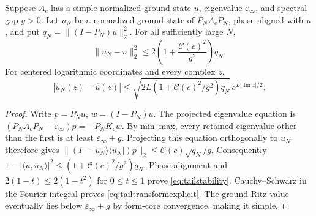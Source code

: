 \begin{proposition}
\label{prop:tailstability}
Suppose $A_c$ has a simple normalized ground state $u$, eigenvalue
$\varepsilon_\infty$, and spectral gap $g>0$. Let $u_N$ be a normalized
ground state of $P_NA_cP_N$, phase aligned with $u$, and put
$q_N=\|(I-P_N)u\|_2^2$. For all sufficiently large $N$,
\begin{equation}
 \|u_N-u\|_2^2\le2\left(1+\frac{\mathcal C(c)^2}{g^2}\right)q_N.
 \label{eq:tailstability}
\end{equation}
For centered logarithmic coordinates and every complex $z$,
\begin{equation}
 |\widehat u_N(z)-\widehat u(z)|
 \le\sqrt{2L\left(1+\mathcal C(c)^2/g^2\right)q_N}\,
       e^{L|\operatorname{Im}z|/2}.\label{eq:tailtransformexplicit}
\end{equation}
\end{proposition}
\begin{proof}
Write $p=P_Nu$, $w=(I-P_N)u$. The projected eigenvalue equation is
$(P_NA_cP_N-\varepsilon_\infty)p=-P_NK_cw$.
By min--max, every retained eigenvalue other than the first is at least
$\varepsilon_\infty+g$. Projecting this equation orthogonally to $u_N$
therefore gives $\|(I-|u_N\rangle\langle u_N|)p\|_2
\le\mathcal C(c)\sqrt{q_N}/g$. Consequently
$1-|\langle u,u_N\rangle|^2\le(1+\mathcal C(c)^2/g^2)q_N$.
Phase alignment and $2(1-t)\le2(1-t^2)$ for $0\le t\le1$ prove
\eqref{eq:tailstability}. Cauchy--Schwarz in the Fourier integral proves
\eqref{eq:tailtransformexplicit}. The ground Ritz value eventually lies
below $\varepsilon_\infty+g$ by form-core convergence, making it simple.
\end{proof}

